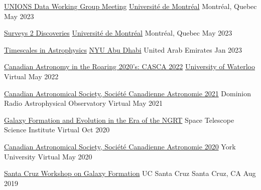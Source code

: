 \begin{cvhonors}
  \cvhonor
    {\href{https://www.skysurvey.cc/aboutus/}{UNIONS Data Working Group Meeting}} %
    {\href{https://www.umontreal.ca/}{Universit{\'e} de Montr{\'e}al}} %
    {Montr{\'e}al, Quebec} %
    {May 2023} %

  \cvhonor
    {\href{https://www.s2dconference.com/}{Surveys 2 Discoveries}} %
    {\href{https://www.umontreal.ca/}{Universit{\'e} de Montr{\'e}al}} %
    {Montr{\'e}al, Quebec} %
    {May 2023} %
    
  \cvhonor
    {\href{https://www.nyuadtimescales.com/}{Timescales in Astrophysics}} %
    {\href{https://nyuad.nyu.edu/en/}{NYU Abu Dhabi}} %
    {United Arab Emirates} %
    {Jan 2023} %
    
  \cvhonor
    {\href{https://uwaterloo.ca/canadian-astronomical-society/}{Canadian Astronomy in the Roaring 2020’s: CASCA 2022}} %
    {\href{https://uwaterloo.ca/}{University of Waterloo}} %
    {Virtual} %
    {May 2022} %
    
  \cvhonor
    {\href{https://casca2021.astroherzberg.org/}{Canadian Astronomical Society, Société Canadienne Astronomie 2021}} %
    {Dominion Radio Astrophysical Observatory} %
    {Virtual} %
    {May 2021\vfill} %
        
  \cvhonor
    {\href{https://astrobites.org/2020/10/17/galaxy-formation-and-evolution-in-the-era-of-the-nancy-grace-roman-telescope/}{Galaxy Formation and Evolution in the Era of the NGRT}} %
    {Space Telescope Science Institute} %
    {Virtual} %
    {Oct 2020} %
    
  \cvhonor
    {\href{https://casca2020.yorku.ca/}{Canadian Astronomical Society, Société Canadienne Astronomie 2020}} %
    {York University} %
    {Virtual} %
    {May 2020} %
    
  \cvhonor
    {\href{http://hipacc.ucsc.edu/GalaxyWorkshop2019.html}{Santa Cruz Workshop on Galaxy Formation}} %
    {UC Santa Cruz} %
    {Santa Cruz, CA} %
    {Aug 2019} %
    

\end{cvhonors}
